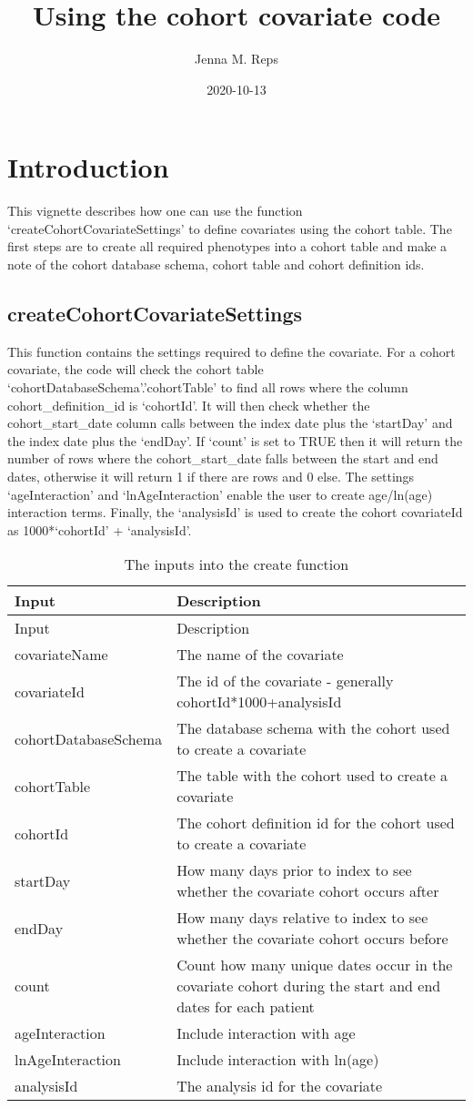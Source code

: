 \documentclass[
]{article}
\title{Using the cohort covariate code}
\author{Jenna M. Reps}
\date{2020-10-13}
\begin{document}
\maketitle

{
\setcounter{tocdepth}{2}
\tableofcontents
}
\hypertarget{introduction}{%
\section{Introduction}\label{introduction}}

This vignette describes how one can use the function
`createCohortCovariateSettings' to define covariates using the cohort
table. The first steps are to create all required phenotypes into a
cohort table and make a note of the cohort database schema, cohort table
and cohort definition ids.

\hypertarget{createcohortcovariatesettings}{%
\subsection{createCohortCovariateSettings}\label{createcohortcovariatesettings}}

This function contains the settings required to define the covariate.
For a cohort covariate, the code will check the cohort table
`cohortDatabaseSchema'.'cohortTable' to find all rows where the column
cohort\_definition\_id is `cohortId'. It will then check whether the
cohort\_start\_date column calls between the index date plus the
`startDay' and the index date plus the `endDay'. If `count' is set to
TRUE then it will return the number of rows where the
cohort\_start\_date falls between the start and end dates, otherwise it
will return 1 if there are rows and 0 else. The settings
`ageInteraction' and `lnAgeInteraction' enable the user to create
age/ln(age) interaction terms. Finally, the `analysisId' is used to
create the cohort covariateId as 1000*`cohortId' + `analysisId'.

\begin{longtable}[]{@{}ll@{}}
\caption{The inputs into the create function}\tabularnewline
\toprule
Input & Description\tabularnewline
\midrule
\endfirsthead
\toprule
Input & Description\tabularnewline
\midrule
\endhead
covariateName & The name of the covariate\tabularnewline
covariateId & The id of the covariate - generally
cohortId*1000+analysisId\tabularnewline
cohortDatabaseSchema & The database schema with the cohort used to
create a covariate\tabularnewline
cohortTable & The table with the cohort used to create a
covariate\tabularnewline
cohortId & The cohort definition id for the cohort used to create a
covariate\tabularnewline
startDay & How many days prior to index to see whether the covariate
cohort occurs after\tabularnewline
endDay & How many days relative to index to see whether the covariate
cohort occurs before\tabularnewline
count & Count how many unique dates occur in the covariate cohort during
the start and end dates for each patient\tabularnewline
ageInteraction & Include interaction with age\tabularnewline
lnAgeInteraction & Include interaction with ln(age)\tabularnewline
analysisId & The analysis id for the covariate\tabularnewline
\bottomrule
\end{longtable}
\end{document}
